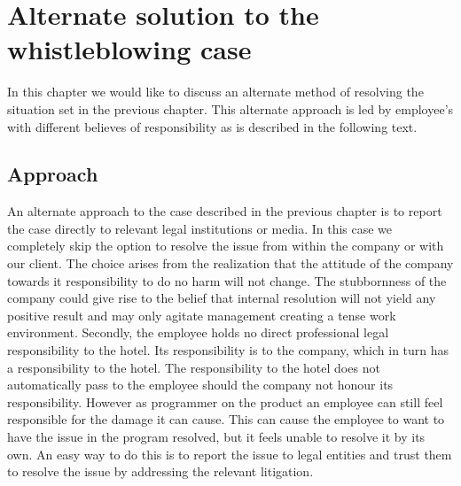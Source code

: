 \chapter{Alternate solution to the whistleblowing case}
\label{chap:alternate_approach}
In this chapter we would like to discuss an alternate method of resolving the situation set in the previous chapter. This alternate approach is led by employee's with different believes of responsibility as is described in the following text.

\section{Approach}
An alternate approach to the case described in the previous chapter is to report the case directly to relevant legal institutions or media. In this case we completely skip the option to resolve the issue from within the company or with our client.
The choice arises from the realization that the attitude of the company towards it responsibility to do no harm will not change. The stubbornness of the company could give rise to the belief that internal resolution will not yield any positive result and may only agitate management creating a tense work environment. 
Secondly, the employee holds no direct professional legal responsibility to the hotel. Its responsibility is to the company, which in turn has a responsibility to the hotel. The responsibility to the hotel does not automatically pass to the employee should the company not honour its responsibility. 
However as programmer on the product an employee can still feel responsible for the damage it can cause. This can cause the employee to want to have the issue in the program resolved, but it feels unable to resolve it by its own. An easy way to do this is to report the issue to legal entities and trust them to resolve the issue by addressing the relevant litigation. 

